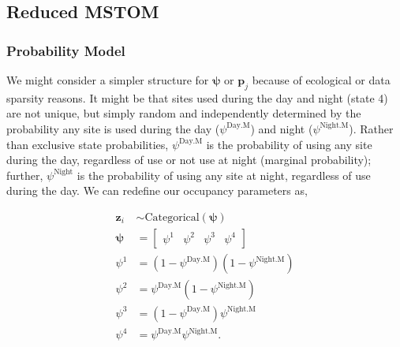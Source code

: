 \documentclass[12pt]{article}
\begin{document}
\subsection{Reduced MSTOM}
\subsubsection{Probability Model}
We might consider a simpler structure for $\boldsymbol{\psi}$ or $\boldsymbol{p}_{j}$ because of ecological or data sparsity reasons. It might be that sites used during the day and night (state 4) are not unique, but simply random and independently determined by the probability any site is used during the day ($\psi^{\text{Day.M}}$) and night ($\psi^{\text{Night.M}}$). Rather than exclusive state probabilities, $\psi^{\text{Day.M}}$ is the probability of using any site during the day, regardless of use or not use at night (marginal probability); further, $\psi^{\text{Night}}$ is the probability of using any site at night, regardless of use during the day.  We can redefine our occupancy parameters as,
\begin{center}
\begin{align*}
\textbf{z}_{i} &\sim \text{Categorical}(\boldsymbol{\psi})\\
\boldsymbol{\psi} &= \begin{bmatrix} \psi^1 & \psi^2 & \psi^3 & \psi^4 \end{bmatrix}\\
\psi^1 &=(1-\psi^{\text{Day.M}})(1-\psi^{\text{Night.M}})\\
\psi^2 &=\psi^{\text{Day.M}}(1-\psi^{\text{Night.M}})\\
\psi^3 &=(1-\psi^{\text{Day.M}})\psi^{\text{Night.M}}\\
\psi^4 &=\psi^{\text{Day.M}}\psi^{\text{Night.M}}.\\
\end{align*}
\end{center}
\end{document}
